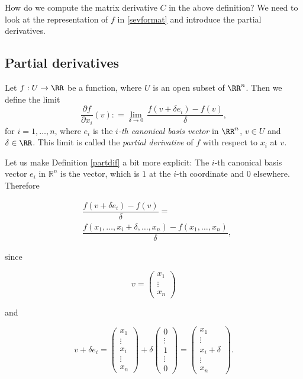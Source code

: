\documentclass{article}
\begin{document}
How do we compute the matrix derivative $C$ in the above definition?
We need to look at the representation of $f$ in \eqref{sevformat} and
introduce the partial derivatives.

\subsection{Partial derivatives}

\begin{definition}[emph]\label{partdif}
  Let $f: U\rightarrow \RR$ be a function, where $U$ is an open subset
  of $\RR^n$. Then we define the limit
  \begin{equation*}
    \frac{\partial f}{\partial x_i}(v): = \lim_{\delta\to 0} \,\frac{f(v +
      \delta e_i) - f(v)}{\delta},
  \end{equation*}
  for $i = 1, \dots, n$, where $e_i$ 
  is the \emph{$i$-th canonical basis vector} in $\RR^n$, $v\in U$ and
  $\delta\in \RR$. This limit is called the \emph{partial derivative}
  of $f$ with respect to $x_i$ at $v$.
\end{definition}

\begin{frameit}
\begin{remark}
Let us make Definition \ref{partdif} a bit more explicit:
The $i$-th canonical basis vector $e_i$ in $\mathbb{R}^n$ is the vector, which is $1$ at the $i$-th coordinate and $0$ elsewhere. Therefore 

$$
\begin{aligned}
&\dfrac{f(v + \delta e_i) - f(v)}{\delta} =\\ 
&\dfrac{f(x_1, \dots, x_i + \delta, \dots, x_n) - f(x_1, \dots, x_n)}{\delta},
\end{aligned}
$$

since

$$
v = \begin{pmatrix}x_1\\ \vdots\\ x_n \end{pmatrix}
$$

and

$$
v + \delta e_i = \begin{pmatrix}x_1\\ \vdots \\ x_i \\ \vdots \\ x_n \end{pmatrix} + \delta 
\begin{pmatrix} 0\\ \vdots\\ 1 \\ \vdots \\0 \end{pmatrix} = 
\begin{pmatrix}x_1\\ \vdots\\ x_i + \delta \\ \vdots \\ x_n \end{pmatrix}.
$$
\end{remark}
\end{frameit}
\end{document}
